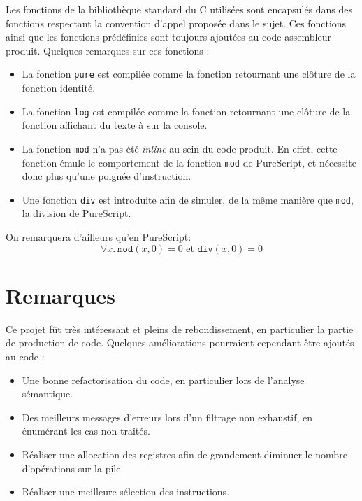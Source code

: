 \documentclass[french, 12pt]{article}
\newcommand{\ps}{\textsf{PureScript}}
\begin{document}
Les fonctions de la bibliothèque standard du C utilisées sont encapsulés dans
des fonctions respectant la convention d'appel proposée dans le sujet. Ces
fonctions ainsi que les fonctions prédéfinies sont toujours ajoutées au code
assembleur produit. Quelques remarques sur ces fonctions :
\begin{itemize}
    \item La fonction \texttt{pure} est compilée comme la fonction retournant
          une clôture de la fonction identité.
    \item La fonction \texttt{log} est compilée comme la fonction retournant une
          clôture de la fonction affichant du texte à sur la console.
    \item La fonction \texttt{mod} n'a pas été \textit{inline} au sein du code
          produit. En effet, cette fonction émule le comportement de la fonction
          \texttt{mod} de \ps, et nécessite donc plus qu'une poignée
          d'instruction.
    \item Une fonction \texttt{div} est introduite afin de simuler, de la même
          manière que \texttt{mod}, la division de \ps.
\end{itemize}

On remarquera d'ailleurs qu'en \ps :
\[
    \forall x.~ \texttt{mod}\left(x, 0\right) = 0 \text{ et }
    \texttt{div}\left(x, 0\right) = 0
\]

\section*{Remarques}
Ce projet fût très intéressant et pleins de rebondissement, en particulier la
partie de production de code. Quelques améliorations pourraient cependant être
ajoutés au code :
\begin{itemize}
    \item Une bonne refactorisation du code, en particulier lors de l'analyse
          sémantique.
    \item Des meilleurs messages d'erreurs lors d'un filtrage non exhaustif, en
          énumérant les cas non traités.
    \item Réaliser une allocation des registres afin de grandement diminuer le
          nombre d'opérations sur la pile
    \item Réaliser une meilleure sélection des instructions.
\end{itemize}
\end{document}
